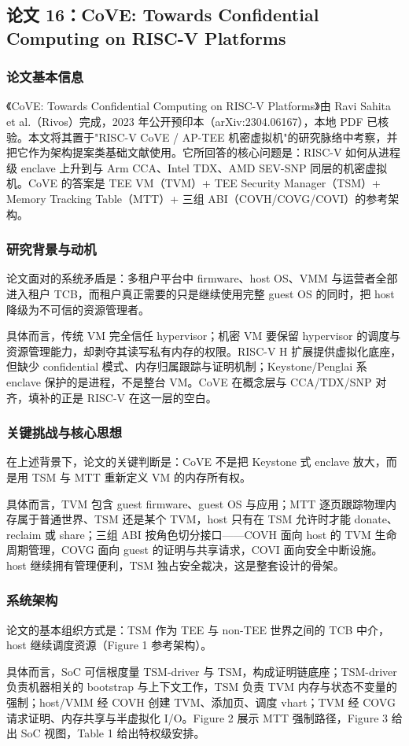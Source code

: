 \documentclass[11pt]{ctexart}
\begin{document}
\subsection{论文 16：CoVE: Towards Confidential Computing on RISC-V Platforms}
\subsubsection{论文基本信息}
《CoVE: Towards Confidential Computing on RISC-V Platforms》由 Ravi Sahita et al.（Rivos）完成，2023 年公开预印本（arXiv:2304.06167），本地 PDF 已核验。本文将其置于"RISC-V CoVE / AP-TEE 机密虚拟机"的研究脉络中考察，并把它作为架构提案类基础文献使用。它所回答的核心问题是：RISC-V 如何从进程级 enclave 上升到与 Arm CCA、Intel TDX、AMD SEV-SNP 同层的机密虚拟机。CoVE 的答案是 TEE VM（TVM）+ TEE Security Manager（TSM）+ Memory Tracking Table（MTT）+ 三组 ABI（COVH/COVG/COVI）的参考架构。\cite{sahita2023cove}\par
\subsubsection{研究背景与动机}
论文面对的系统矛盾是：多租户平台中 firmware、host OS、VMM 与运营者全部进入租户 TCB，而租户真正需要的只是继续使用完整 guest OS 的同时，把 host 降级为不可信的资源管理者。\par
具体而言，传统 VM 完全信任 hypervisor；机密 VM 要保留 hypervisor 的调度与资源管理能力，却剥夺其读写私有内存的权限。RISC-V H 扩展提供虚拟化底座，但缺少 confidential 模式、内存归属跟踪与证明机制；Keystone/Penglai 系 enclave 保护的是进程，不是整台 VM。CoVE 在概念层与 CCA/TDX/SNP 对齐，填补的正是 RISC-V 在这一层的空白。\par
\subsubsection{关键挑战与核心思想}
在上述背景下，论文的关键判断是：CoVE 不是把 Keystone 式 enclave 放大，而是用 TSM 与 MTT 重新定义 VM 的内存所有权。\par
具体而言，TVM 包含 guest firmware、guest OS 与应用；MTT 逐页跟踪物理内存属于普通世界、TSM 还是某个 TVM，host 只有在 TSM 允许时才能 donate、reclaim 或 share；三组 ABI 按角色切分接口——COVH 面向 host 的 TVM 生命周期管理，COVG 面向 guest 的证明与共享请求，COVI 面向安全中断设施。host 继续拥有管理便利，TSM 独占安全裁决，这是整套设计的骨架。\par
\subsubsection{系统架构}
论文的基本组织方式是：TSM 作为 TEE 与 non-TEE 世界之间的 TCB 中介，host 继续调度资源（Figure 1 参考架构）。\par
具体而言，SoC 可信根度量 TSM-driver 与 TSM，构成证明链底座；TSM-driver 负责机器相关的 bootstrap 与上下文工作，TSM 负责 TVM 内存与状态不变量的强制；host/VMM 经 COVH 创建 TVM、添加页、调度 vhart；TVM 经 COVG 请求证明、内存共享与半虚拟化 I/O。Figure 2 展示 MTT 强制路径，Figure 3 给出 SoC 视图，Table 1 给出特权级安排。\par
\end{document}
